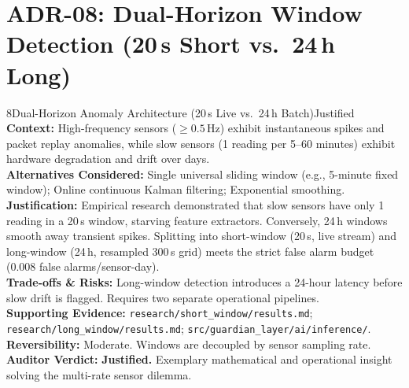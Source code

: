 \documentclass[10pt,a4paper]{report}
\begin{document}
\section{ADR-08: Dual-Horizon Window Detection (20\,s Short vs.\ 24\,h Long)}
\begin{adrbox}{8}{Dual-Horizon Anomaly Architecture (20\,s Live vs.\ 24\,h Batch)}{Justified}
\textbf{Context:} High-frequency sensors ($\ge 0.5$\,Hz) exhibit instantaneous spikes and packet replay anomalies, while slow sensors (1 reading per 5--60 minutes) exhibit hardware degradation and drift over days.\\
\textbf{Alternatives Considered:} Single universal sliding window (e.g., 5-minute fixed window); Online continuous Kalman filtering; Exponential smoothing.\\
\textbf{Justification:} Empirical research demonstrated that slow sensors have only 1 reading in a 20\,s window, starving feature extractors. Conversely, 24\,h windows smooth away transient spikes. Splitting into short-window (20\,s, live stream) and long-window (24\,h, resampled 300\,s grid) meets the strict false alarm budget (0.008 false alarms/sensor-day).\\
\textbf{Trade-offs \& Risks:} Long-window detection introduces a 24-hour latency before slow drift is flagged. Requires two separate operational pipelines.\\
\textbf{Supporting Evidence:} \texttt{research/short\_window/results.md}; \texttt{research/long\_window/results.md}; \texttt{src/guardian\_layer/ai/inference/}.\\
\textbf{Reversibility:} Moderate. Windows are decoupled by sensor sampling rate.\\
\textbf{Auditor Verdict:} \textbf{Justified.} Exemplary mathematical and operational insight solving the multi-rate sensor dilemma.
\end{adrbox}
\end{document}
